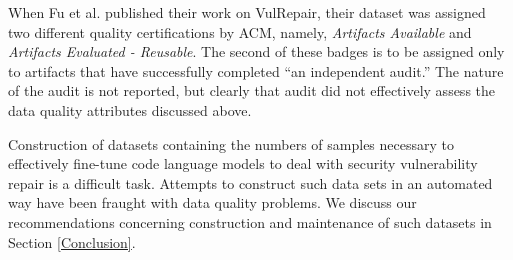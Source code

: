 When Fu et al. published their work on VulRepair, their dataset was assigned two different quality certifications by ACM, namely, \emph{Artifacts Available} and \emph{Artifacts Evaluated - Reusable}\cite{acm-badges}.
The second of these badges is to be assigned only to artifacts that have successfully completed ``an independent audit.''
The nature of the audit is not reported, but clearly that audit did not effectively assess the data quality attributes discussed above.

Construction of datasets containing the numbers of samples necessary to effectively fine-tune code language models to deal with security vulnerability repair is a difficult task.
Attempts to construct such data sets in an automated way have been fraught with data quality problems.
We discuss our recommendations concerning construction and maintenance of such datasets in Section \ref{Conclusion}.